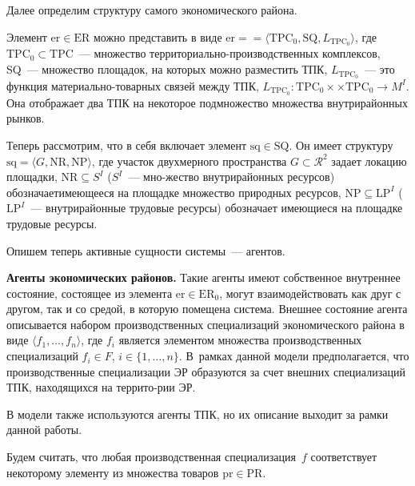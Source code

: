 \begin{multicols}{2}
  Далее определим структуру самого экономического района.

Элемент $\mathrm{er}\in \mathrm{ER}$ можно представить в виде $\mathrm{er}=$\linebreak $=\langle \mathrm{TPC}_0, \mathrm{SQ}, 
L_{\mathrm{TPC}_0}\rangle$, где $\mathrm{TPC}_0\subset \mathrm{TPC}$~--- множество 
тер\-ри\-то\-ри\-аль\-но-про\-из\-вод\-ст\-вен\-ных комплексов, SQ~---
множество площадок, на которых можно разместить ТПК, $L_{\mathrm{TPC}_0}$~--- это 
функция ма\-те\-ри\-аль\-но-то\-вар\-ных связей между ТПК, $L_{\mathrm{TPC}_0}: 
\mathrm{TPC}_0\times$\linebreak $\times \mathrm{TPC}_0\rightarrow M^I$. Она отображает два 
ТПК на некоторое подмножество множества 
внутрирайонных рынков.
  
  Теперь рассмотрим, что в себя включает элемент $\mathrm{sq}\in \mathrm{SQ}$. Он имеет 
структуру $\mathrm{sq}=\langle G,\mathrm{NR},\mathrm{NP}\rangle$, где участок двухмерного пространства 
$G\subset \mathcal{R}^2$ задает локацию площадки, $\mathrm{NR}\subseteq S^I$ 
  ($S^I$~--- мно-\linebreak жество внутрирайонных ресурсов) обозначает\linebreak име\-юще\-еся на 
площадке множество природных ресурсов, $\mathrm{NP}\subseteq \mathrm{LP}^I$ ($\mathrm{LP}^I$~--- 
внутрирайонные трудовые ресурсы) обозначает имеющиеся на площадке 
трудовые ресурсы.
  
  Опишем теперь активные сущности системы~--- агентов.
  
  \smallskip
  
  \textbf{Агенты экономических районов.} Такие агенты имеют 
собственное внутреннее состояние, состоящее из элемента $\mathrm{er}\in \mathrm{ER}_0$, могут 
взаимодействовать как друг с другом, так и со средой, в которую помещена 
система. Внешнее состояние агента описывается набором производственных 
специализаций экономического района в виде $\langle f_1, \ldots , f_n\rangle$, 
где $f_i$ является элементом множества производственных специализаций 
$f_i\in F$, $i\in \{1, \ldots , n\}$. В~рамках данной модели предполагается, что 
производственные специализации ЭР образуются за счет 
внешних специализаций ТПК, находящихся на террито-\linebreak рии ЭР.
  
  В модели также используются агенты ТПК, но их описание выходит за рамки 
данной работы.
  
  Будем считать, что любая производственная специализация~$f$ 
соответствует некоторому элементу из множества товаров $\mathrm{pr}\in \mathrm{PR}$.


\end{multicols}
